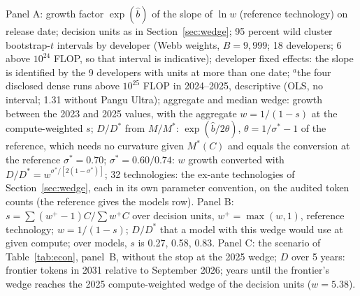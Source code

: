 \begin{table}[tp]
\begin{tablenotes}[Notes]
Panel A: growth factor $\exp(\hat b)$ of the slope of $\ln w$ (reference technology) on release date; decision units as in Section~\ref{sec:wedge}; 95 percent wild cluster bootstrap-$t$ intervals by developer (Webb weights, $B=9{,}999$; 18 developers; 6 above $10^{24}$ FLOP, so that interval is indicative); developer fixed effects: the slope is identified by the 9 developers with units at more than one date; $^a$the four disclosed dense runs above $10^{25}$ FLOP in 2024--2025, descriptive (OLS, no interval; 1.31 without Pangu Ultra); aggregate and median wedge: growth between the 2023 and 2025 values, with the aggregate $w=1/(1-s)$ at the compute-weighted $s$; $D/D^*$ from $M/M^*$: $\exp(\hat b/2\theta)$, $\theta=1/\sigma^*-1$ of the reference, which needs no curvature given $M^*(C)$ and equals the conversion at the reference $\sigma^*=0.70$; $\sigma^*=0.60/0.74$: $w$ growth converted with $D/D^*=w^{\sigma^*/[2(1-\sigma^*)]}$; 32 technologies: the ex-ante technologies of Section~\ref{sec:wedge}, each in its own parameter convention, on the audited token counts (the reference gives the models row). Panel B: $s=\sum(w^+-1)C/\sum w^+C$ over decision units, $w^+=\max(w,1)$, reference technology; $w=1/(1-s)$; $D/D^*$ that a model with this wedge would use at given compute; over models, $s$ is 0.27, 0.58, 0.83. Panel C: the scenario of Table~\ref{tab:econ}, panel~B, without the stop at the 2025 wedge; $D$ over 5 years: frontier tokens in 2031 relative to September 2026; years until the frontier's wedge reaches the 2025 compute-weighted wedge of the decision units ($w=5.38$).
\end{tablenotes}
\end{table}
